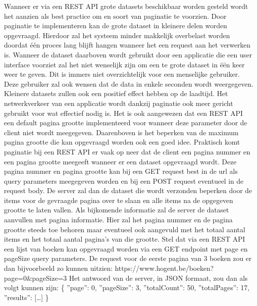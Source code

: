 Wanneer er via een REST API grote datasets beschikbaar worden gesteld wordt het aanzien als best practice om en soort van paginatie te voorzien. Door paginatie te
implementeren kan de grote dataset in kleinere delen worden opgevraagd. Hierdoor zal het systeem minder makkelijk overbelast worden doordat \'e\'en proces lang blijft
hangen wanneer het een request aan het verwerken is. Wanneer de dataset daarboven wordt gebruikt door een applicatie die een user interface voorziet zal het
niet wenselijk zijn om een te grote dataset in \"e\"en keer weer te geven. Dit is immers niet overzichtelijk voor een menselijke gebruiker.
Deze gebruiker zal ook wensen dat de data in enkele seconden wordt weergegeven. Kleinere datasets zullen ook een positief effect hebben op de laadtijd.
Het netwerkverkeer van een applicatie wordt dankzij paginatie ook meer gericht gebruikt voor wat effectief nodig is. Het is ook aangewezen dat een REST API een
default pagina grootte implementeerd voor wanneer deze parameter door de client niet wordt meegegeven. Daarenboven is het beperken van de maximum pagina grootte die
kan opgevraagd worden ook een goed idee.
Praktisch komt paginatie bij een REST API er vaak op neer dat de client een pagina nummer en een pagina grootte meegeeft wanneer er een dataset opgevraagd wordt.
Deze pagina nummer en pagina grootte kan bij een GET request best in de url als query parameters meegegeven worden en bij een POST request eventueel in de request body.
De server zal dan de dataset die wordt verzonden beperken door de items voor de gevraagde pagina over te slaan en alle items na de opgegeven grootte te laten vallen.
Als bijkomende informatie zal de server de dataset aanvullen met pagina informatie. Hier zal het pagina nummer en de pagina grootte steeds toe behoren maar eventueel
ook aangevuld met het totaal aantal items en het totaal aantal pagina's van die grootte.
Stel dat via een REST API een lijst van boeken kan opgevraagd worden via een GET endpoint met page en pageSize query parameters. De request voor de eerste pagina
van 3 boeken zou er dan bijvoorbeeld zo kunnen uitzien:\newline
https://www.hogent.be/boeken?page=0\&pageSize=3
Het antwoord van de server, in JSON formaat, zou dan als volgt kunnen zijn:\newline
\{
''page'': 0,
''pageSize'': 3,
''totalCount'': 50,
''totalPages'': 17,
''results'': [\ldots]
\}\newline
~\autocite{paging}\\
~\autocite{wachtenLaadtijd}\\


